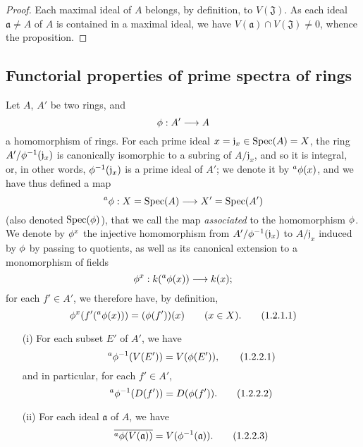 \begin{proof}
\label{proof-1.1.1.15}
Each maximal ideal of $A$ belongs, by definition, to $V(\mathfrak{J})$.
As each ideal $\mathfrak{a}\neq A$ of $A$ is contained in a maximal ideal, we have $V(\mathfrak{a})\cap V(\mathfrak{J})\neq 0$, whence the proposition.
\end{proof}

\subsection{Functorial properties of prime spectra of rings}
\label{subsection:1.1.2}

\begin{env}[1.2.1]
\label{1.1.2.1}
Let $A$, $A'$ be two rings, and
\[
  \vphi:A'\to A
\]
a homomorphism of rings.
For each prime ideal $x=\mathfrak{j}_x\in\operatorname{Spec}(A)=X$, the ring $A'/\phi^{-1}(\mathfrak{j}_x)$ is canonically isomorphic to a subring of $A/\mathfrak{j}_x$, and so it is integral, or, in other words, $\phi^{-1}(\mathfrak{j}_x)$ is a prime ideal of $A'$;
we denote it by ${}^a\phi(x)$, and we have thus defined a map
\[
  {}^a\vphi:X=\Spec(A)\to X'=\Spec(A')
\]
(also denoted $\operatorname{Spec}(\phi)$), that we call the map \emph{associated} to the homomorphism $\phi$.
We denote by $\phi^x$ the injective homomorphism from $A'/\phi^{-1}(\mathfrak{j}_x)$ to $A/\mathfrak{j}_x$ induced by $\phi$ by passing to quotients, as well as its canonical extension to a monomorphism of fields
\[
  \vphi^x:\kres({}^a\vphi(x))\to\kres(x);
\]
\erratum[II]{}
for each $f'\in A'$, we therefore have, by definition,
\[
  \phi^x(f'({}^a\phi(x)))=(\phi(f'))(x)\qquad(x\in X).
  \tag{1.2.1.1}
\]
\end{env}

\begin{proposition}[1.2.2]
\label{1.1.2.2}
\medskip\noindent
\begin{enumerate}
  \item[{\rm(i)}] For each subset $E'$ of $A'$, we have
    \[
    \label{1.1.2.2.1}
      {}^a\phi^{-1}(V(E'))=V(\phi(E')),
      \tag{1.2.2.1}
    \]
    and in particular, for each $f'\in A'$,
    \[
    \label{1.1.2.2.2}
      {}^a\phi^{-1}(D(f'))=D(\phi(f')).
      \tag{1.2.2.2}
    \]
  \item[{\rm(ii)}] For each ideal $\mathfrak{a}$ of $A$, we have
    \[
    \label{1.1.2.2.3}
      \overline{{}^a\phi(V(\mathfrak{a}))}=V(\phi^{-1}(\mathfrak{a})).
      \tag{1.2.2.3}
    \]
\end{enumerate}
\end{proposition}


